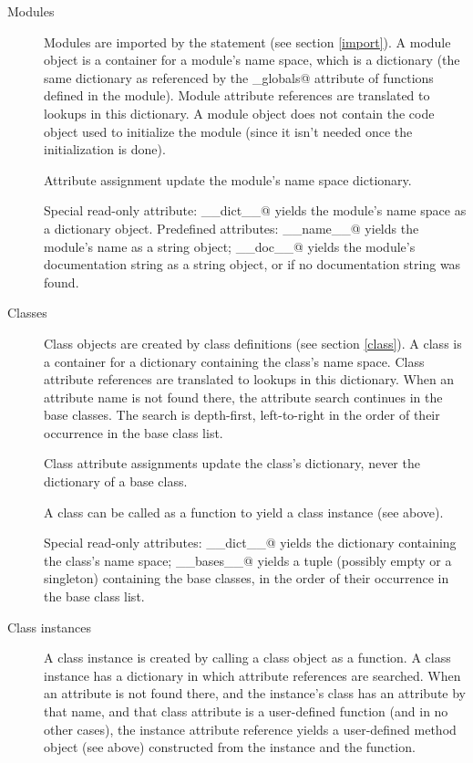 \begin{description}
\item[Modules]
Modules are imported by the \verb@import@ statement (see section
\ref{import}).  A module object is a container for a module's name
space, which is a dictionary (the same dictionary as referenced by the
\verb@func_globals@ attribute of functions defined in the module).
Module attribute references are translated to lookups in this
dictionary.  A module object does not contain the code object used to
initialize the module (since it isn't needed once the initialization
is done).

Attribute assignment update the module's name space dictionary.

Special read-only attribute: \verb@__dict__@ yields the module's name
space as a dictionary object.  Predefined attributes: \verb@__name__@
yields the module's name as a string object; \verb@__doc__@ yields the
module's documentation string as a string object, or
\verb@None@ if no documentation string was found.

\item[Classes]
Class objects are created by class definitions (see section
\ref{class}).  A class is a container for a dictionary containing the
class's name space.  Class attribute references are translated to
lookups in this dictionary.  When an attribute name is not found
there, the attribute search continues in the base classes.  The search
is depth-first, left-to-right in the order of their occurrence in the
base class list.

Class attribute assignments update the class's dictionary, never the
dictionary of a base class.

A class can be called as a function to yield a class instance (see
above).

Special read-only attributes: \verb@__dict__@ yields the dictionary
containing the class's name space; \verb@__bases__@ yields a tuple
(possibly empty or a singleton) containing the base classes, in the
order of their occurrence in the base class list.

\item[Class instances]
A class instance is created by calling a class object as a
function.  A class instance has a dictionary in which
attribute references are searched.  When an attribute is not found
there, and the instance's class has an attribute by that name, and
that class attribute is a user-defined function (and in no other
cases), the instance attribute reference yields a user-defined method
object (see above) constructed from the instance and the function.


\end{description}
